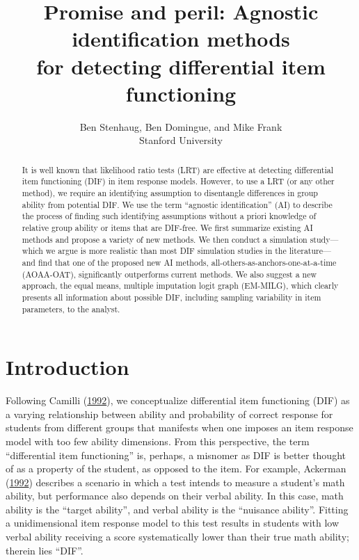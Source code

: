 \documentclass[
  11pt,
]{article}
\title{Promise and peril: Agnostic identification methods\\
for detecting differential item functioning}
\subtitle{Ben Stenhaug, Ben Domingue, and Mike Frank\\
Stanford University}
\author{}
\date{\vspace{-2.5em}}
\begin{document}
\maketitle
\begin{abstract}
It is well known that likelihood ratio tests (LRT) are effective at detecting differential item functioning (DIF) in item response models. However, to use a LRT (or any other method), we require an identifying assumption to disentangle differences in group ability from potential DIF. We use the term ``agnostic identification'' (AI) to describe the process of finding such identifying assumptions without a priori knowledge of relative group ability or items that are DIF-free. We first summarize existing AI methods and propose a variety of new methods. We then conduct a simulation study---which we argue is more realistic than most DIF simulation studies in the literature---and find that one of the proposed new AI methods, all-others-as-anchors-one-at-a-time (AOAA-OAT), significantly outperforms current methods. We also suggest a new approach, the equal means, multiple imputation logit graph (EM-MILG), which clearly presents all information about possible DIF, including sampling variability in item parameters, to the analyst. \clearpage
\end{abstract}

{
\setcounter{tocdepth}{5}
\tableofcontents
}
\clearpage

\hypertarget{intro}{%
\section{Introduction}\label{intro}}

Following Camilli (\protect\hyperlink{ref-camilli1992conceptual}{1992}), we conceptualize differential item functioning (DIF) as a varying relationship between ability and probability of correct response for students from different groups that manifests when one imposes an item response model with too few ability dimensions. From this perspective, the term \enquote{differential item functioning} is, perhaps, a misnomer as DIF is better thought of as a property of the student, as opposed to the item. For example, Ackerman (\protect\hyperlink{ref-ackerman1992didactic}{1992}) describes a scenario in which a test intends to measure a student's math ability, but performance also depends on their verbal ability. In this case, math ability is the \enquote{target ability}, and verbal ability is the \enquote{nuisance ability}. Fitting a unidimensional item response model to this test results in students with low verbal ability receiving a score systematically lower than their true math ability; therein lies \enquote{DIF}.
\end{document}
